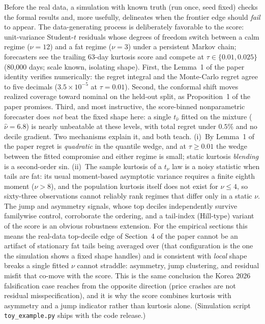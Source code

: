 \documentclass[11pt]{article}
\begin{document}
Before the real data, a simulation with known truth (run once, seed
fixed) checks the formal results and, more usefully, delineates when
the frontier edge should \emph{fail} to appear. The data-generating
process is deliberately favorable to the score: unit-variance
Student-$t$ residuals whose degrees of freedom switch between a calm
regime ($\nu=12$) and a fat regime ($\nu=3$) under a persistent Markov
chain; forecasters see the trailing 63-day kurtosis score and compete
at $\tau \in \{0.01, 0.025\}$ (80{,}000 days; scale known, isolating
shape). First, the Lemma~1 of the paper identity
verifies numerically: the regret integral and the Monte-Carlo regret
agree to five decimals ($3.5\times10^{-5}$ at $\tau=0.01$). Second, the
conformal shift moves realized coverage toward nominal on the held-out
split, as Proposition~1 of the paper promises. Third, and most instructive, the score-binned nonparametric
forecaster does
\emph{not} beat the fixed shape here: a single $t_{\widehat\nu}$
fitted on the mixture ($\widehat\nu = 6.8$) is nearly unbeatable at
these levels, with total regret under $0.5\%$ and no decile gradient.
Two mechanisms explain it, and both teach. (i)~By
Lemma~1 of the paper regret is \emph{quadratic} in the quantile
wedge, and at $\tau \ge 0.01$ the wedge between the fitted compromise
and either regime is small; static kurtosis \emph{blending} is a
second-order sin. (ii)~The sample kurtosis of a $t_\nu$ law is a noisy statistic when
tails are fat: its usual moment-based asymptotic variance requires a
finite eighth moment ($\nu>8$), and the population kurtosis itself does
not exist for $\nu\le4$, so sixty-three observations cannot reliably
rank regimes that differ only in a static $\nu$. The jump and
asymmetry signals, whose top deciles independently survive familywise
control, corroborate the ordering, and a tail-index (Hill-type)
variant of the score is an obvious robustness extension. For the empirical sections this means the real-data top-decile edge of Section~4 of the paper
cannot be an artifact of stationary fat tails being averaged over
(that configuration is the one the simulation shows a fixed shape
handles) and is consistent with \emph{local} shape breaks a single
fitted $\nu$ cannot straddle: asymmetry, jump clustering, and residual misfit
that co-move with the score. This is the same conclusion the Korea 2026
falsification case reaches from the opposite direction (price crashes
are not residual misspecification), and it is why the score combines
kurtosis with asymmetry and a jump indicator rather than kurtosis
alone. (Simulation script \texttt{toy\_example.py} ships with the code
release.)
\end{document}
